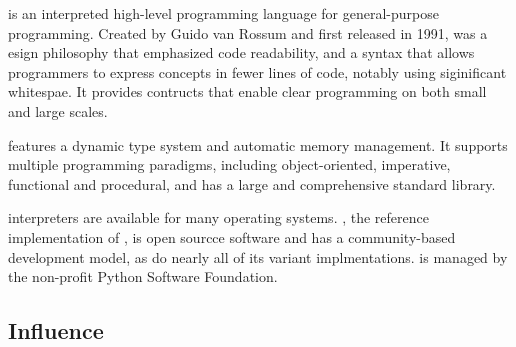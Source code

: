 \documentclass[../Languages.tex]{subfiles}
\begin{document}
\label{sec:python_2}

 is an interpreted high-level programming language for
general-purpose programming. Created by Guido van Rossum and first released in
1991,  was a esign philosophy that emphasized code readability, and
a syntax that allows programmers to express concepts in fewer lines of code,
notably using siginificant whitespae. It provides contructs that enable clear
programming on both small and large scales.

 features a dynamic type system and automatic memory management. It
supports multiple programming paradigms, including object-oriented, imperative,
functional and procedural, and has a large and comprehensive standard library.

 interpreters are available for many operating systems.
, the reference implementation of , is open sourcce
software and has a community-based development model, as do nearly all of its
variant implmentations.  is managed by the non-profit Python
Software Foundation.

\subsection{Influence}\label{sub:influence}
\end{document}

